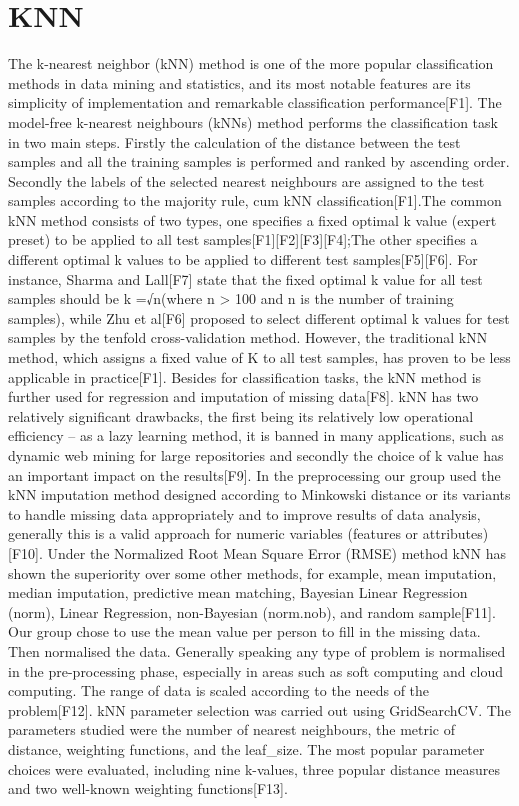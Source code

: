 \section{KNN}
The k-nearest neighbor (kNN) method is one of the more popular classification methods in data mining and statistics, and its most notable features are its simplicity of implementation and remarkable classification performance[F1].
The model-free k-nearest neighbours (kNNs) method performs the classification task in two main steps. Firstly the calculation of the distance between the test samples and all the training samples is performed and ranked by ascending order. Secondly the labels of the selected nearest neighbours are assigned to the test samples according to the majority rule, cum kNN classification[F1].The common kNN method consists of two types, one specifies a fixed optimal k value (expert preset) to be applied to all test samples[F1][F2][F3][F4];The other specifies a different optimal k values to be applied to different test samples[F5][F6]. For instance, Sharma and Lall[F7] state that the fixed optimal k value for all test samples should be k =√n(where n > 100 and n is the number of training samples), while Zhu et al[F6] proposed to select different optimal k values for test samples by the tenfold cross-validation method. However, the traditional kNN method, which assigns a fixed value of K to all test samples, has proven to be less applicable in practice[F1]. Besides for classification tasks, the kNN method is further used for regression and imputation of missing data[F8]. kNN has two relatively significant drawbacks, the first being its relatively low operational efficiency – as a lazy learning method, it is banned in many applications, such as dynamic web mining for large repositories and secondly the choice of k value has an important impact on the results[F9].
In the preprocessing our group used the kNN imputation method designed according to Minkowski distance or its variants to handle missing data appropriately and to improve results of data analysis, generally this is a valid approach for numeric variables (features or attributes)[F10]. Under the Normalized Root Mean Square Error (RMSE) method kNN has shown the superiority over some other methods, for example, mean imputation, median imputation, predictive mean matching, Bayesian Linear Regression (norm), Linear Regression, non-Bayesian (norm.nob), and random sample[F11]. Our group chose to use the mean value per person to fill in the missing data. Then normalised the data. Generally speaking any type of problem is normalised in the pre-processing phase, especially in areas such as soft computing and cloud computing. The range of data is scaled according to the needs of the problem[F12].
kNN parameter selection was carried out using GridSearchCV. The parameters studied were the number of nearest neighbours, the metric of distance, weighting functions, and the leaf_size. The most popular parameter choices were evaluated, including nine k-values, three popular distance measures and two well-known weighting functions[F13].

